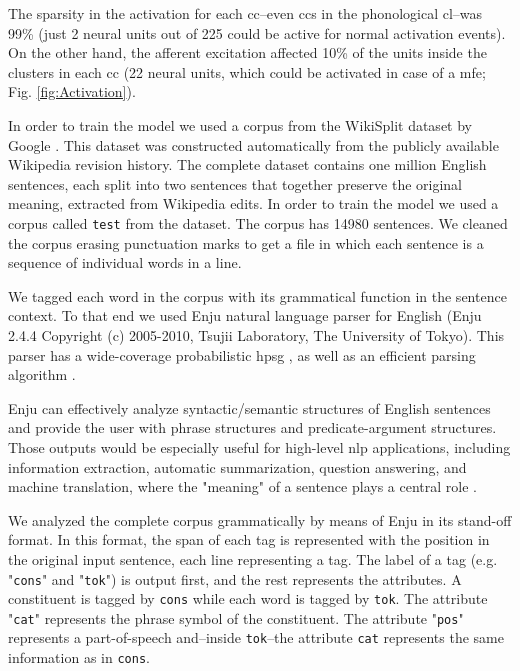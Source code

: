 {The sparsity in the activation for each \gls{cc}--even \glspl{cc} in the phonological \gls{cl}--was 99\% (just 2 neural units out of 225 could be active for normal activation events). On the other hand, the afferent excitation affected 10\% of the units inside the clusters in each \gls{cc} (22 neural units, which could be activated in case of a \gls{mfe}; Fig. \ref{fig:Activation}).

In order to train the model we used a corpus from the WikiSplit dataset by Google \cite{BothaEtAl2018}. This dataset was constructed automatically from the publicly available Wikipedia revision history. The complete dataset contains one million English sentences, each split into two sentences that together preserve the original meaning, extracted from Wikipedia edits. In order to train the model we used a corpus called \texttt{test} from the dataset. The corpus has 14980 sentences. We cleaned the corpus erasing punctuation marks to get a file in which each sentence is a sequence of individual words in a line.

We tagged each word in the corpus with its grammatical function in the sentence context. To that end we used Enju natural language parser for English (Enju 2.4.4 Copyright (c) 2005-2010, Tsujii Laboratory, The University of Tokyo). This parser has a wide-coverage probabilistic \gls{hpsg} \cite{Yusuke:2002:MEE:1289189.1289214, noauthor_2_nodate, Miyao2004CorpusOrientedGD, Miyao:2005:PDM:1219840.1219851, Ninomiya:2006:ELM:1610075.1610100, Ninomiya:2007:LMN:1621410.1621418, Miyao:2008:FFM:1350986.1350988}, as well as an efficient parsing algorithm \cite{tsuruoka:2004b, Ninomiya:2005:EBT:1654494.1654505, bc22fe91f8a743269f26f92abfd79790, Matsuzaki:2007:EHP:1625275.1625546}.

Enju can effectively analyze syntactic/semantic structures of English sentences and provide the user with phrase structures and predicate-argument structures. Those outputs would be especially useful for high-level \gls{nlp} applications, including information extraction, automatic summarization, question answering, and machine translation, where the "meaning" of a sentence plays a central role \cite{noauthor_english_2019}. 

We analyzed the complete corpus grammatically by means of Enju in its stand-off format. In this format, the span of each tag is represented with the position in the original input sentence, each line representing a tag.  The label of a tag (e.g. "\texttt{cons}" and "\texttt{tok}") is output first, and the rest represents the attributes. A constituent is tagged by \texttt{cons} while each word is tagged by \texttt{tok}. The attribute "\texttt{cat}" represents the phrase symbol of the constituent. The attribute "\texttt{pos}" represents a part-of-speech and--inside \texttt{tok}--the attribute \texttt{cat} represents the same information as in \texttt{cons}.

}
